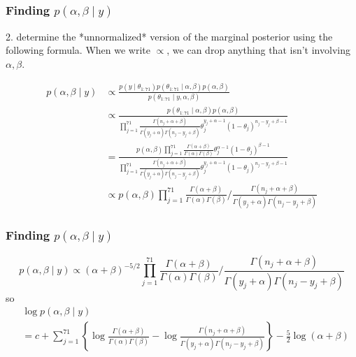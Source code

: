 \documentclass{beamer}
\begin{document}
\begin{frame}
\frametitle{Finding $p(\alpha,\beta \mid y)$ }

2. determine the *unnormalized* version of the marginal posterior using the following formula. When we write $\propto$, we can drop anything that isn't involving $\alpha, \beta$.

\begin{align*}
p(\alpha, \beta \mid y) &\propto \frac{p(y \mid \theta_{1:71})p(\theta_{1:71} \mid \alpha, \beta)p(\alpha, \beta) }{p(\theta_{1:71} \mid y, \alpha, \beta) } \tag{earlier slides} \\
&\propto \frac{p(\theta_{1:71} \mid \alpha, \beta)p(\alpha, \beta) }{ \prod_{j=1}^{71}\frac{\Gamma(n_j + \alpha + \beta )}{ \Gamma(y_j+\alpha)\Gamma(n_j - y_j + \beta) }\theta_j^{y_j+\alpha-1}(1-\theta_j)^{n_j - y_j + \beta-1} } \\
&= \frac{ p(\alpha, \beta) \prod_{j=1}^{71} \frac{\Gamma(\alpha + \beta )}{ \Gamma(\alpha)\Gamma( \beta) } \theta_j^{\alpha-1}(1-\theta_j)^{\beta-1}  }{ \prod_{j=1}^{71}\frac{\Gamma(n_j + \alpha + \beta )}{ \Gamma(y_j+\alpha)\Gamma(n_j - y_j + \beta) }\theta_j^{y_j+\alpha-1}(1-\theta_j)^{n_j - y_j + \beta-1} } \\
&\propto p(\alpha, \beta) \prod_{j=1}^{71} \frac{\Gamma(\alpha + \beta )}{ \Gamma(\alpha)\Gamma( \beta) } \bigg/ \frac{\Gamma(n_j + \alpha + \beta )}{ \Gamma(y_j+\alpha)\Gamma(n_j - y_j + \beta) } 
\end{align*}

\end{frame}

\begin{frame}
\frametitle{Finding $p(\alpha,\beta \mid y)$ }

\[
p(\alpha, \beta \mid y) \propto (\alpha + \beta)^{-5/2} \prod_{j=1}^{71} \frac{\Gamma(\alpha + \beta )}{ \Gamma(\alpha)\Gamma( \beta) } \bigg/ \frac{\Gamma(n_j + \alpha + \beta )}{ \Gamma(y_j+\alpha)\Gamma(n_j - y_j + \beta) }
\]
so
\begin{align*}
&\log p(\alpha, \beta \mid y) \\
&= c +  \sum_{j=1}^{71} \left\{ \log  \frac{\Gamma(\alpha + \beta )}{ \Gamma(\alpha)\Gamma( \beta) } - \log \frac{\Gamma(n_j + \alpha + \beta )}{ \Gamma(y_j+\alpha)\Gamma(n_j - y_j + \beta) } \right\} - \frac{5}{2} \log (\alpha + \beta)\\
\end{align*}
\end{frame}
\end{document}
